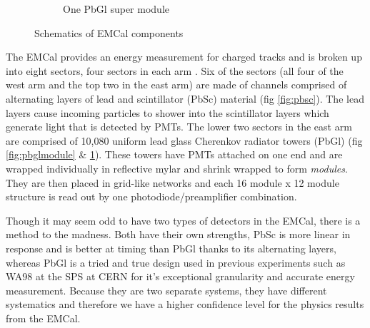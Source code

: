\begin{figure}
\begin{subfigure}[b]{0.6\textwidth}
    \caption{One PbGl super module}
\label{fig:pbglsupmodule}
\end{subfigure}
\caption[Schematics of EMCal components]{Schematics of EMCal components}
\label{fig:EMCalcomponents}
\end{figure}
\dsp

The EMCal provides an energy measurement for charged tracks and is broken up into eight sectors, four sectors in each arm \citep{EMCfocus}. Six of the sectors (all four of the west arm and the top two in the east arm) are made of channels comprised of alternating layers of lead and scintillator (PbSc) material (fig \ref{fig:pbsc}). The lead layers cause incoming particles to shower into the scintillator layers which generate light that is detected by PMTs. The lower two sectors in the east arm are comprised of 10,080 uniform lead glass Cherenkov radiator towers (PbGl) (fig \ref{fig:pbglmodule} \& \ref{fig:pbglsupmodule}). These towers have PMTs attached on one end and are wrapped individually in reflective mylar and shrink wrapped to form \textit{modules}. They are then placed in grid-like networks and each 16 module x 12 module structure is read out by one photodiode/preamplifier combination. 

Though it may seem odd to have two types of detectors in the EMCal, there is a method to the madness. Both have their own strengths, PbSc is more linear in response and is better at timing than PbGl thanks to its alternating layers, whereas PbGl is a tried and true design used in previous experiments such as WA98 at the SPS at CERN for it's exceptional granularity and accurate energy measurement. Because they are two separate systems, they have different systematics and therefore we have a higher confidence level for the physics results from the EMCal. 


